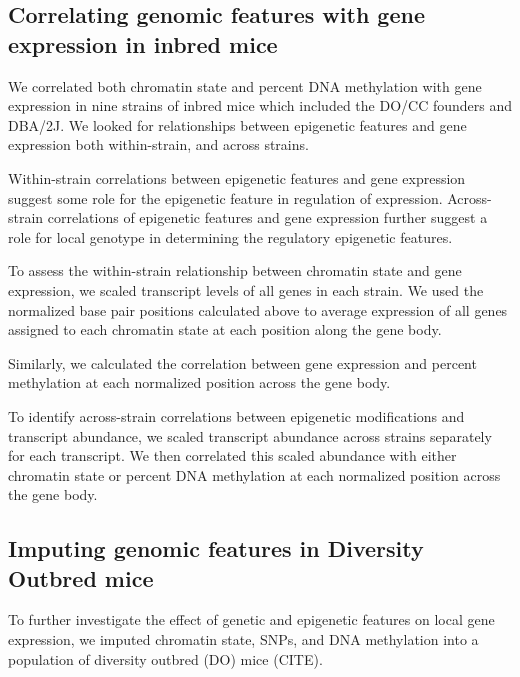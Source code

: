 \documentclass[10pt,letterpaper]{article}
\begin{document}
\hypertarget{correlating-genomic-features-with-gene-expression-in-inbred-mice}{%
\subsection{Correlating genomic features with gene expression in inbred
mice}\label{correlating-genomic-features-with-gene-expression-in-inbred-mice}}

We correlated both chromatin state and percent DNA methylation with gene
expression in nine strains of inbred mice which included the DO/CC
founders and DBA/2J. We looked for relationships between epigenetic
features and gene expression both within-strain, and across strains.

Within-strain correlations between epigenetic features and gene
expression suggest some role for the epigenetic feature in regulation of
expression. Across-strain correlations of epigenetic features and gene
expression further suggest a role for local genotype in determining the
regulatory epigenetic features.

To assess the within-strain relationship between chromatin state and
gene expression, we scaled transcript levels of all genes in each
strain. We used the normalized base pair positions calculated above to
average expression of all genes assigned to each chromatin state at each
position along the gene body.

Similarly, we calculated the correlation between gene expression and
percent methylation at each normalized position across the gene body.

To identify across-strain correlations between epigenetic modifications
and transcript abundance, we scaled transcript abundance across strains
separately for each transcript. We then correlated this scaled abundance
with either chromatin state or percent DNA methylation at each
normalized position across the gene body.

\hypertarget{imputing-genomic-features-in-diversity-outbred-mice}{%
\subsection{Imputing genomic features in Diversity Outbred
mice}\label{imputing-genomic-features-in-diversity-outbred-mice}}

To further investigate the effect of genetic and epigenetic features on
local gene expression, we imputed chromatin state, SNPs, and DNA
methylation into a population of diversity outbred (DO) mice (CITE).
\end{document}
